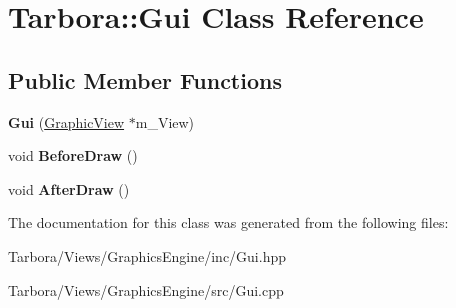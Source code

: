 \hypertarget{classTarbora_1_1Gui}{}\section{Tarbora\+:\+:Gui Class Reference}
\label{classTarbora_1_1Gui}
\subsection*{Public Member Functions}
\begin{DoxyCompactItemize}
\item 
\mbox{\label{classTarbora_1_1Gui_a0a10aa5be9231d8aaef71240b6a8f627}} 
{\bfseries Gui} (\hyperlink{classTarbora_1_1GraphicView}{Graphic\+View} $\ast$m\+\_\+\+View)
\item 
\mbox{\label{classTarbora_1_1Gui_ad54c6113521ed94d15dac59236b75eba}} 
void {\bfseries Before\+Draw} ()
\item 
\mbox{\label{classTarbora_1_1Gui_ada60edc7d56f37a97a966be65c64c74c}} 
void {\bfseries After\+Draw} ()
\end{DoxyCompactItemize}


The documentation for this class was generated from the following files\+:\begin{DoxyCompactItemize}
\item 
Tarbora/\+Views/\+Graphics\+Engine/inc/Gui.\+hpp\item 
Tarbora/\+Views/\+Graphics\+Engine/src/Gui.\+cpp\end{DoxyCompactItemize}

